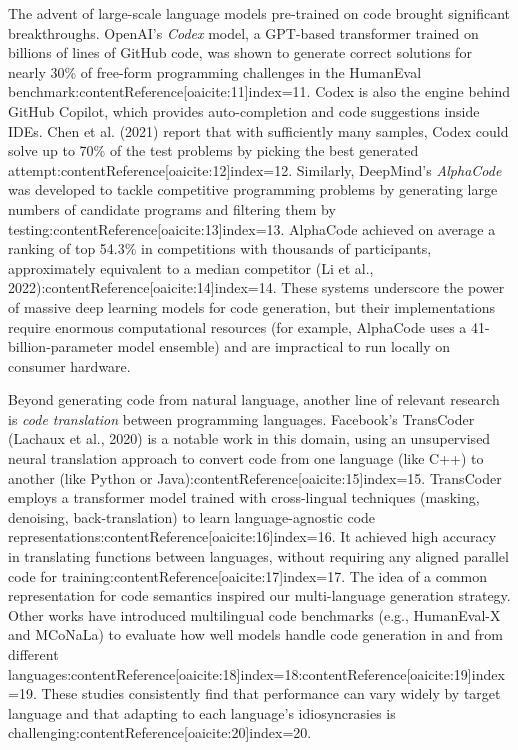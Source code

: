 \documentclass[12pt]{article}
\begin{document}
The advent of large-scale language models pre-trained on code brought significant breakthroughs. OpenAI’s \textit{Codex} model, a GPT-based transformer trained on billions of lines of GitHub code, was shown to generate correct solutions for nearly 30\% of free-form programming challenges in the HumanEval benchmark:contentReference[oaicite:11]{index=11}. Codex is also the engine behind GitHub Copilot, which provides auto-completion and code suggestions inside IDEs. Chen et al. (2021) report that with sufficiently many samples, Codex could solve up to 70\% of the test problems by picking the best generated attempt:contentReference[oaicite:12]{index=12}. Similarly, DeepMind’s \textit{AlphaCode} was developed to tackle competitive programming problems by generating large numbers of candidate programs and filtering them by testing:contentReference[oaicite:13]{index=13}. AlphaCode achieved on average a ranking of top 54.3\% in competitions with thousands of participants, approximately equivalent to a median competitor (Li et al., 2022):contentReference[oaicite:14]{index=14}. These systems underscore the power of massive deep learning models for code generation, but their implementations require enormous computational resources (for example, AlphaCode uses a 41-billion-parameter model ensemble) and are impractical to run locally on consumer hardware.

Beyond generating code from natural language, another line of relevant research is \textit{code translation} between programming languages. Facebook’s TransCoder (Lachaux et al., 2020) is a notable work in this domain, using an unsupervised neural translation approach to convert code from one language (like C++) to another (like Python or Java):contentReference[oaicite:15]{index=15}. TransCoder employs a transformer model trained with cross-lingual techniques (masking, denoising, back-translation) to learn language-agnostic code representations:contentReference[oaicite:16]{index=16}. It achieved high accuracy in translating functions between languages, without requiring any aligned parallel code for training:contentReference[oaicite:17]{index=17}. The idea of a common representation for code semantics inspired our multi-language generation strategy. Other works have introduced multilingual code benchmarks (e.g., HumanEval-X and MCoNaLa) to evaluate how well models handle code generation in and from different languages:contentReference[oaicite:18]{index=18}:contentReference[oaicite:19]{index=19}. These studies consistently find that performance can vary widely by target language and that adapting to each language’s idiosyncrasies is challenging:contentReference[oaicite:20]{index=20}.
\end{document}
